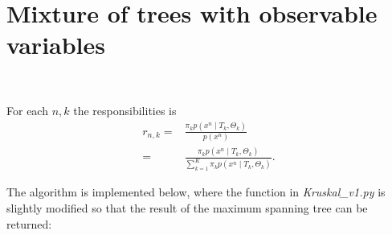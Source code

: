 \documentclass[11pt]{extarticle}
\newcommand{\0}{\mathbf{0}}
\renewcommand{\(}{\left(}
\renewcommand{\)}{\right)}
\theoremstyle{definition}
\begin{document}
\newpage
\section{Mixture of trees with observable variables}
\noindent{} \\
\par For each $n,k$ the responsibilities is
\begin{align*}
	r_{n,k} =& \frac{\pi_{k}p(x^{n} \mid T_{k}, \Theta_{k})}{p(x^{n})} \\
	=& \frac{\pi_{k}p(x^{n} \mid T_{k}, \Theta_{k})}{\sum_{k=1}^{K} \pi_{k}p(x^{n} \mid T_{k}, \Theta_{k})}.
\end{align*}
\par The algorithm is implemented below, where the function in \textit{Kruskal\_v1.py} is slightly modified so that the result of the maximum spanning tree can be returned:

\end{document}
